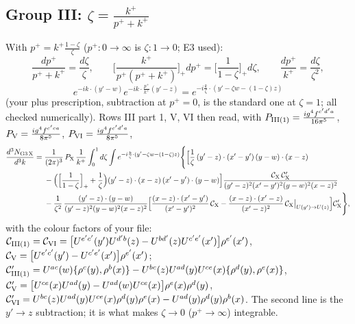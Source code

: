 \documentclass[10pt]{article}
\numberwithin{equation}{section}
\begin{document}
\subsection{Group III: $\zeta=\frac{k^+}{p^++k^+}$}
With $p^+=k^+\frac{1-\zeta}{\zeta}$ ($p^+:0\to\infty$ is $\zeta:1\to0$; E3 used):
\begin{equation}
\frac{dp^+}{p^++k^+}=\frac{d\zeta}{\zeta},\qquad\Big[\frac{k^+}{p^+(p^++k^+)}\Big]_+dp^+=\Big[\frac{1}{1-\zeta}\Big]_+d\zeta,\qquad\frac{dp^+}{k^+}=\frac{d\zeta}{\zeta^2},\end{equation}\begin{equation}e^{-ik\cdot(y'-w)}e^{-ik\cdot\frac{p^+}{k^+}(y'-z)}=e^{-i\frac{k}{\zeta}\cdot\left(y'-\zeta w-(1-\zeta)z\right)}
\end{equation}
(your plus prescription, subtraction at $p^+=0$, is the standard one at $\zeta=1$; all checked numerically). Rows III part 1, V, VI then read, with $P_{\rm III(1)}=\frac{ig^4f^{c'd'a}}{16\pi^5}$, $P_{\rm V}=\frac{ig^4f^{c'ca}}{8\pi^5}$, $P_{\rm VI}=\frac{ig^4f^{c'd'a}}{8\pi^5}$,
\begin{align}
\frac{d^3N_{\rm G3\,X}}{d^3k}={}&\frac{1}{(2\pi)^3}\,P_{\rm X}\,\frac{1}{k^+}\int_0^1d\zeta\int e^{-i\frac{k}{\zeta}\cdot(y'-\zeta w-(1-\zeta)z)}\Bigg\{\Big[\frac1\zeta\,(y'-z)\cdot(x'-y')\,(y-w)\cdot(x-z)\notag\\
&-\Big(\Big[\frac{1}{1-\zeta}\Big]_++\frac1\zeta\Big)(y'-z)\cdot(x-z)\,(x'-y')\cdot(y-w)\Big]\frac{\mathcal C_{\rm X}\,\mathcal C'_{\rm X}}{(y'-z)^{2}(x'-y')^{2}(y-w)^{2}(x-z)^{2}}\notag\\
&-\frac{1}{\zeta^2}\,\frac{(y'-z)\cdot(y-w)}{(y'-z)^{2}(y-w)^{2}(x-z)^{2}}\Big[\frac{(x-z)\cdot(x'-y')}{(x'-y')^2}\,\mathcal C_{\rm X}-\frac{(x-z)\cdot(x'-z)}{(x'-z)^2}\,\mathcal C_{\rm X}\big|_{U(y')\to U(z)}\Big]\mathcal C'_{\rm X}\Bigg\},\label{eq:G3}
\end{align}
with the colour factors of your file: $\mathcal C_{\rm III(1)}=\mathcal C_{\rm VI}=\big[U^{e'c'}(y')U^{d'b}(z)-U^{bd'}(z)U^{c'e'}(x')\big]\rho^{e'}(x')$, $\mathcal C_{\rm V}=\big[U^{e'c'}(y')-U^{c'e'}(x')\big]\rho^{e'}(x')$; $\mathcal C'_{\rm III(1)}=U^{ac}(w)\{\rho^c(y),\rho^b(x)\}-U^{bc}(z)U^{ad}(y)U^{ce}(x)\{\rho^d(y),\rho^e(x)\}$, $\mathcal C'_{\rm V}=\big[U^{ce}(x)U^{ad}(y)-U^{ad}(w)U^{ce}(x)\big]\rho^e(x)\rho^d(y)$, $\mathcal C'_{\rm VI}=U^{bc}(z)U^{ad}(y)U^{ce}(x)\rho^d(y)\rho^e(x)-U^{ad}(y)\rho^d(y)\rho^b(x)$. The second line is the $y'\to z$ subtraction; it is what makes $\zeta\to0$ ($p^+\to\infty$) integrable.
\end{document}
